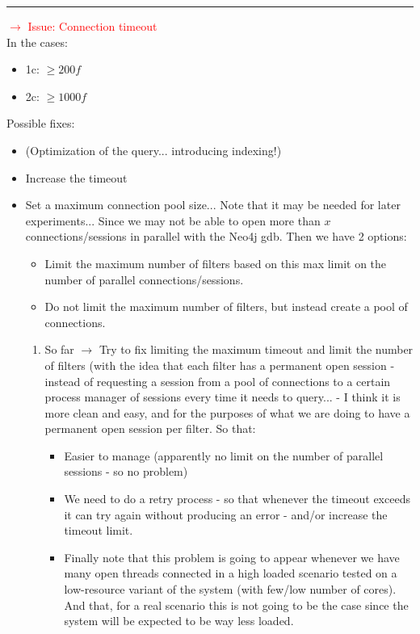 \documentclass[12pt,a4paper]{article}
\begin{document}
\rule{\textwidth}{0.4pt} 
\textcolor{red}{$\rightarrow$ Issue: Connection timeout\\}
In the cases: 
\begin{itemize}
    \item 1c: $\ge 200f$
    \item 2c: $\ge 1000f$
\end{itemize}

Possible fixes:
\begin{itemize}
    \item (Optimization of the query... introducing indexing!)
    \item Increase the timeout
    \item Set a maximum connection pool size... Note that it may be needed for later experiments...
    Since we may not be able to open more than $x$ connections/sessions in parallel with the Neo4j gdb. Then we have 2 options:
    \begin{itemize}
        \item Limit the maximum number of filters based on this max limit on the number of parallel connections/sessions.
        \item Do not limit the maximum number of filters, but instead create a pool of connections.
    \end{itemize}
    \begin{enumerate}
        \item So far $\rightarrow$ Try to fix limiting the maximum timeout and limit the number of filters (with the idea that each filter has a permanent open session - instead of requesting a session from a pool of connections to a certain process manager of sessions every time it needs to query... - I think it is more clean and easy, and for the purposes of what we are doing to have a permanent open session per filter. So that:
        \begin{itemize}
            \item Easier to manage (apparently no limit on the number of parallel sessions - so no problem)
            \item We need to do a retry process - so that whenever the timeout exceeds it can try again without producing an error - and/or increase the timeout limit.
            \item Finally note that this problem is going to appear whenever we have many open threads connected in a high loaded scenario tested on a low-resource variant of the system (with few/low number of cores). And that, for a real scenario this is not going to be the case since the system will be expected to be way less loaded.
        \end{itemize}
    \end{enumerate}
\end{itemize}
\end{document}
